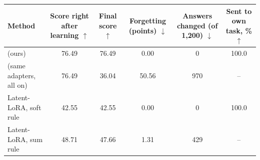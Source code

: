 \begin{tabular}{lccccc}
    \toprule
    Method & \shortstack[c]{Score\\right after\\learning $\uparrow$} & \shortstack[c]{Final\\score $\uparrow$} & \shortstack[c]{Forgetting\\(points) $\downarrow$} & \shortstack[c]{Answers\\changed (of\\1{,}200) $\downarrow$} & \shortstack[c]{Sent to own\\task, \% $\uparrow$} \\
    \midrule
    \cert{} (ours) & 76.49 & 76.49 & 0.00 & 0 & 100.0 \\
    \plain{} (same adapters, all on) & 76.49 & 36.04 & 50.56 & 970 & -- \\
    \midrule
    Latent-LoRA, soft rule & 42.55 & 42.55 & 0.00 & 0 & 100.0 \\
    Latent-LoRA, sum rule & 48.71 & 47.66 & 1.31 & 429 & -- \\
    \bottomrule
\end{tabular}
